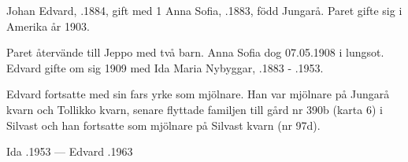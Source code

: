 %
Johan Edvard, .1884, gift med 1 Anna Sofia, .1883, född Jungarå. Paret gifte sig i Amerika år 1903.
\begin{jhchildren}
  \item {}
  \item {}
  \item {}
\end{jhchildren}
Paret återvände till Jeppo med två barn. Anna Sofia dog 07.05.1908 i lungsot. Edvard gifte om sig 1909 med Ida Maria Nybyggar, .1883  -	.1953.
\begin{jhchildren}
  \item {}
  \item {}
  \item {}
\end{jhchildren}
Edvard fortsatte med sin fars yrke som mjölnare. Han var mjölnare på Jungarå kvarn och Tollikko kvarn, senare flyttade familjen till gård nr 390b (karta 6) i Silvast och han fortsatte som mjölnare på Silvast kvarn (nr 97d).

Ida .1953  ---  Edvard .1963


